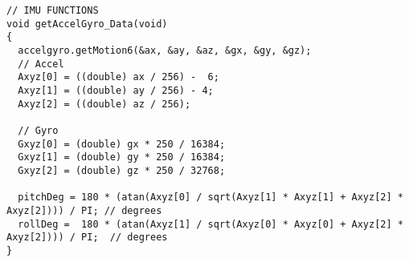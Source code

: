 \begin{lstlisting}
// IMU FUNCTIONS
void getAccelGyro_Data(void)
{
  accelgyro.getMotion6(&ax, &ay, &az, &gx, &gy, &gz);
  // Accel
  Axyz[0] = ((double) ax / 256) -  6;
  Axyz[1] = ((double) ay / 256) - 4;
  Axyz[2] = ((double) az / 256);
 
  // Gyro
  Gxyz[0] = (double) gx * 250 / 16384;
  Gxyz[1] = (double) gy * 250 / 16384;
  Gxyz[2] = (double) gz * 250 / 32768;
 
  pitchDeg = 180 * (atan(Axyz[0] / sqrt(Axyz[1] * Axyz[1] + Axyz[2] * Axyz[2]))) / PI; // degrees
  rollDeg =  180 * (atan(Axyz[1] / sqrt(Axyz[0] * Axyz[0] + Axyz[2] * Axyz[2]))) / PI;  // degrees
}
\end{lstlisting}
